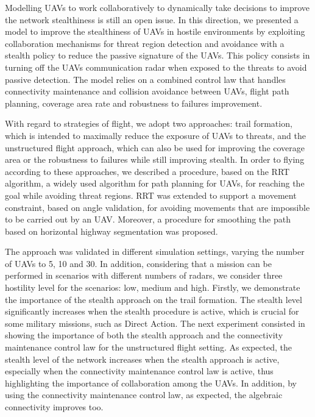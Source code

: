 
Modelling UAVs to work collaboratively to dynamically take decisions to improve the network stealthiness is still an open issue. In this direction,  we presented a model to improve the stealthiness of UAVs in hostile environments by exploiting collaboration mechanisms for threat region detection and avoidance with a stealth policy to reduce the passive signature of the UAVs. This policy consists in turning off the UAVs communication radar when exposed to the threats to avoid passive detection. The model relies on a combined control law that handles connectivity maintenance and collision avoidance between UAVs, flight path planning, coverage area rate and robustness to failures improvement.

With regard to strategies of flight, we adopt two approaches: trail formation, which is intended to maximally reduce the exposure of UAVs to threats, and the unstructured flight approach, which can also be used for improving the coverage area or the robustness to failures while still improving stealth. In order to flying according to these approaches, we described a procedure, based on the RRT algorithm, a widely used algorithm for path planning for UAVs, for reaching the goal while avoiding threat regions. RRT was extended to support a movement constraint, based on angle validation, for avoiding movements that are impossible to be carried out by an UAV. Moreover, a procedure for smoothing the path based on horizontal highway segmentation was proposed.

The approach was validated in different simulation settings, varying the number of UAVs to 5, 10 and 30. In addition, considering that a mission can be performed in scenarios with different numbers of radars, we consider three hostility level for the scenarios: low, medium and high. Firstly, we demonstrate the importance of the stealth approach on the trail formation. The stealth level significantly increases when the stealth procedure is active, which is crucial for some military missions, such as Direct Action. The next experiment consisted in showing the importance of both the stealth approach and the connectivity maintenance control law for the unstructured flight setting. As expected, the stealth level of the network increases when the stealth approach is active, especially when the connectivity maintenance control law is active, thus highlighting the importance of collaboration among the UAVs. In addition, by using the connectivity maintenance control law, as expected, the algebraic connectivity improves too.

